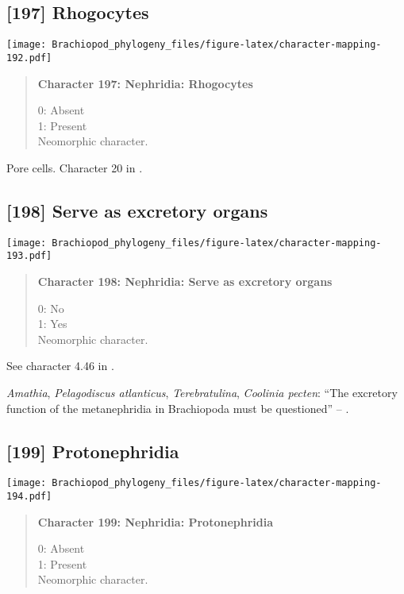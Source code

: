 \documentclass[openany]{book}
\theoremstyle{definition}
\theoremstyle{definition}
\theoremstyle{definition}
\theoremstyle{remark}
\begin{document}
\subsection*{{[}197{]} Rhogocytes}\label{rhogocytes}

\texttt{[image: Brachiopod\_phylogeny\_files/figure-latex/character-mapping-192.pdf]}

\begin{quote}
\textbf{Character 197: Nephridia: Rhogocytes}

0: Absent\\
1: Present\\
Neomorphic character.
\end{quote}

Pore cells. Character 20 in \citet{Haszprunar2000}.

\subsection*{{[}198{]} Serve as excretory
organs}\label{serve-as-excretory-organs}

\texttt{[image: Brachiopod\_phylogeny\_files/figure-latex/character-mapping-193.pdf]}

\begin{quote}
\textbf{Character 198: Nephridia: Serve as excretory organs}

0: No\\
1: Yes\\
Neomorphic character.
\end{quote}

See character 4.46 in \citet{SPS1996}.

\hypertarget{Amathia-coding-198}{}
\emph{Amathia}, \emph{Pelagodiscus atlanticus}, \emph{Terebratulina},
\emph{Coolinia pecten}: ``The excretory function of the metanephridia in
Brachiopoda must be questioned'' -- \citet{Luter1995}.

\subsection*{{[}199{]} Protonephridia}\label{protonephridia}

\texttt{[image: Brachiopod\_phylogeny\_files/figure-latex/character-mapping-194.pdf]}

\begin{quote}
\textbf{Character 199: Nephridia: Protonephridia}

0: Absent\\
1: Present\\
Neomorphic character.
\end{quote}
\end{document}

